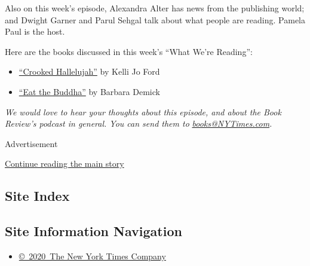 Also on this week's episode, Alexandra Alter has news from the
publishing world; and Dwight Garner and Parul Sehgal talk about what
people are reading. Pamela Paul is the host.

Here are the books discussed in this week's ``What We're Reading'':

\begin{itemize}
\item
  \href{https://www.nytimes3xbfgragh.onion/2020/07/06/books/review-crooked-hallelujah-kelli-jo-ford.html}{``Crooked
  Hallelujah''} by Kelli Jo Ford
\item
  \href{https://www.nytimes3xbfgragh.onion/2020/07/15/books/eat-buddha-life-death-tibetan-town-barbara-demick.html}{``Eat
  the Buddha''} by Barbara Demick
\end{itemize}

\emph{We would love to hear your thoughts about this episode, and about
the Book Review's podcast in general. You can send them to}
\href{mailto:books@NYTimes.com}{\emph{books@NYTimes.com}}\emph{.}

Advertisement

\protect\hyperlink{after-bottom}{Continue reading the main story}

\hypertarget{site-index}{%
\subsection{Site Index}\label{site-index}}

\hypertarget{site-information-navigation}{%
\subsection{Site Information
Navigation}\label{site-information-navigation}}

\begin{itemize}
\tightlist
\item
  \href{https://help.nytimes3xbfgragh.onion/hc/en-us/articles/115014792127-Copyright-notice}{©~2020~The
  New York Times Company}
\end{itemize}

